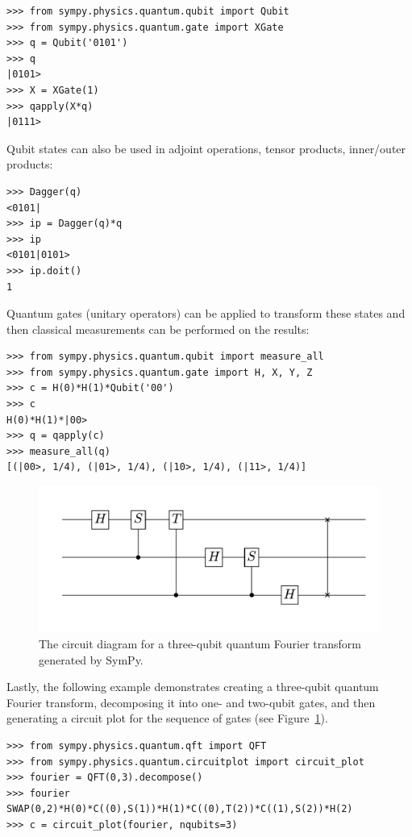\begin{verbatim}
>>> from sympy.physics.quantum.qubit import Qubit
>>> from sympy.physics.quantum.gate import XGate
>>> q = Qubit('0101')
>>> q
|0101>
>>> X = XGate(1)
>>> qapply(X*q)
|0111>
\end{verbatim}
Qubit states can also be used in adjoint operations, tensor products, inner/outer
products:
\begin{verbatim}
>>> Dagger(q)
<0101|
>>> ip = Dagger(q)*q
>>> ip
<0101|0101>
>>> ip.doit()
1
\end{verbatim}
Quantum gates (unitary operators) can be applied to transform these states and
then classical measurements can be performed on the results:
\begin{verbatim}
>>> from sympy.physics.quantum.qubit import measure_all
>>> from sympy.physics.quantum.gate import H, X, Y, Z
>>> c = H(0)*H(1)*Qubit('00')
>>> c
H(0)*H(1)*|00>
>>> q = qapply(c)
>>> measure_all(q)
[(|00>, 1/4), (|01>, 1/4), (|10>, 1/4), (|11>, 1/4)]
\end{verbatim}
\begin{figure}[htbp]
\begin{center}
\includegraphics[scale=0.65]{images/circuitplot-qft}
\caption{The circuit diagram for a three-qubit quantum Fourier transform
generated by SymPy.}
\label{fig-circuitplot-qft}
\end{center}
\end{figure}
Lastly, the following example demonstrates creating a three-qubit quantum Fourier
transform, decomposing it into one- and two-qubit gates, and then generating a
circuit plot for the sequence of gates (see Figure~\ref{fig-circuitplot-qft}).
\begin{verbatim}
>>> from sympy.physics.quantum.qft import QFT
>>> from sympy.physics.quantum.circuitplot import circuit_plot
>>> fourier = QFT(0,3).decompose()
>>> fourier
SWAP(0,2)*H(0)*C((0),S(1))*H(1)*C((0),T(2))*C((1),S(2))*H(2)
>>> c = circuit_plot(fourier, nqubits=3)
\end{verbatim}
